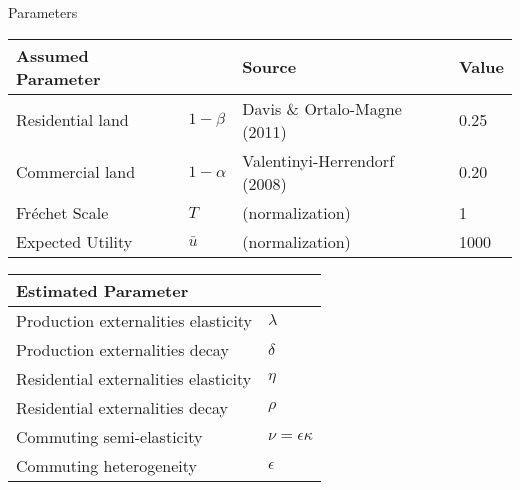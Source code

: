 \documentclass[10pt,notes=hide]{beamer}
\begin{document}
\begin{frame}{Parameters}
\begin{table}[h]
\begin{flushleft}
{\small
\begin{tabular}{llll} \hline\hline
Assumed Parameter & & Source & Value \\ \hline
Residential land & $ 1-\beta $ & Davis \& Ortalo-Magne (2011) & 0.25 \\
Commercial land & $1-\alpha$ & Valentinyi-Herrendorf (2008) & 0.20 \\
Fr\'{e}chet Scale & $T$ & (normalization) & 1 \\
Expected Utility & $\bar{u}$ & (normalization) & 1000 \\ \hline\hline
\end{tabular}
}
\end{flushleft}
\end{table}
\begin{table}[h]
\begin{flushleft}
{\small
\begin{tabular}{ll} \hline\hline
Estimated Parameter \\ \hline
Production externalities elasticity & $\lambda$ \\
Production externalities decay & $\delta$ \\
Residential externalities elasticity & $\eta$ \\
Residential externalities decay & $\rho$ \\
Commuting semi-elasticity & $\nu=\epsilon \kappa$ \\
Commuting heterogeneity & $\epsilon$ \\ \hline\hline
\end{tabular}
}
\end{flushleft}
\end{table}
\end{frame}
\end{document}
